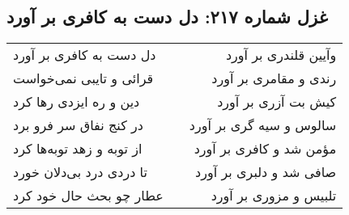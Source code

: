 \begin{center}
\section*{غزل شماره ۲۱۷: دل دست به کافری بر آورد}
\label{sec:217}
\begin{longtable}{l p{0.5cm} r}
دل دست به کافری بر آورد
&&
وآیین قلندری بر آورد
\\
قرائی و تایبی نمی‌خواست
&&
رندی و مقامری بر آورد
\\
دین و ره ایزدی رها کرد
&&
کیش بت آزری بر آورد
\\
در کنج نفاق سر فرو برد
&&
سالوس و سیه گری بر آورد
\\
از توبه و زهد توبه‌ها کرد
&&
مؤمن شد و کافری بر آورد
\\
تا دردی درد بی‌دلان خورد
&&
صافی شد و دلبری بر آورد
\\
عطار چو بحث حال خود کرد
&&
تلبیس و مزوری بر آورد
\\
\end{longtable}
\end{center}
